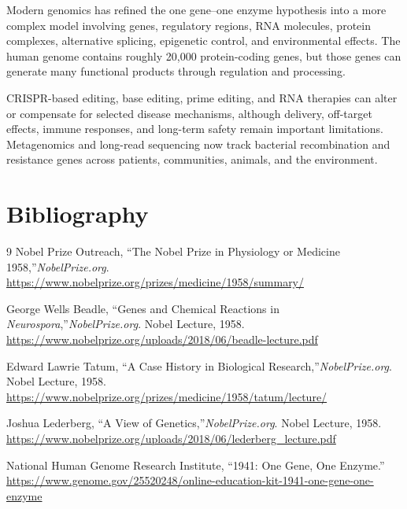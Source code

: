 Modern genomics has refined the one gene--one enzyme hypothesis into a more complex model involving genes, regulatory regions, RNA molecules, protein complexes, alternative splicing, epigenetic control, and environmental effects. The human genome contains roughly 20,000 protein-coding genes, but those genes can generate many functional products through regulation and processing.

CRISPR-based editing, base editing, prime editing, and RNA therapies can alter or compensate for selected disease mechanisms, although delivery, off-target effects, immune responses, and long-term safety remain important limitations. Metagenomics and long-read sequencing now track bacterial recombination and resistance genes across patients, communities, animals, and the environment.

\section{Bibliography}

\begin{thebibliography}{9}
Nobel Prize Outreach, ``The Nobel Prize in Physiology or Medicine 1958,''\emph{NobelPrize.org}.\\
\url{https://www.nobelprize.org/prizes/medicine/1958/summary/}

George Wells Beadle, ``Genes and Chemical Reactions in \textit{Neurospora},''\emph{NobelPrize.org}. Nobel Lecture, 1958.\\
\url{https://www.nobelprize.org/uploads/2018/06/beadle-lecture.pdf}

Edward Lawrie Tatum, ``A Case History in Biological Research,''\emph{NobelPrize.org}. Nobel Lecture, 1958.\\
\url{https://www.nobelprize.org/prizes/medicine/1958/tatum/lecture/}

Joshua Lederberg, ``A View of Genetics,''\emph{NobelPrize.org}. Nobel Lecture, 1958.\\
\url{https://www.nobelprize.org/uploads/2018/06/lederberg_lecture.pdf}

National Human Genome Research Institute, ``1941: One Gene, One Enzyme.''\\
\url{https://www.genome.gov/25520248/online-education-kit-1941-one-gene-one-enzyme}
\end{thebibliography}
